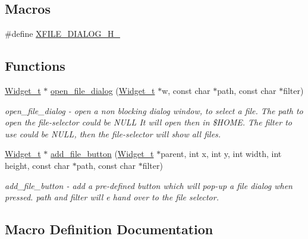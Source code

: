 \subsection*{Macros}
\begin{DoxyCompactItemize}
\item 
\#define \hyperlink{xfile-dialog_8h_a31944331b86f03e65b4333fbab0ccc6f}{X\+F\+I\+L\+E\+\_\+\+D\+I\+A\+L\+O\+G\+\_\+\+H\+\_\+}
\end{DoxyCompactItemize}
\subsection*{Functions}
\begin{DoxyCompactItemize}
\item 
\hyperlink{structWidget__t}{Widget\+\_\+t} $\ast$ \hyperlink{xfile-dialog_8h_a50f41466d35761802fb415011006c6e6}{open\+\_\+file\+\_\+dialog} (\hyperlink{structWidget__t}{Widget\+\_\+t} $\ast$w, const char $\ast$path, const char $\ast$filter)
\begin{DoxyCompactList}\small\item\em open\+\_\+file\+\_\+dialog -\/ open a non blocking dialog window, to select a file. The path to open the file-\/selector could be N\+U\+LL It will open then in \$\+H\+O\+ME. The filter to use could be N\+U\+LL, then the file-\/selector will show all files. \end{DoxyCompactList}\item 
\hyperlink{structWidget__t}{Widget\+\_\+t} $\ast$ \hyperlink{xfile-dialog_8h_aa38720181c2a046546d345b60eb6b7b0}{add\+\_\+file\+\_\+button} (\hyperlink{structWidget__t}{Widget\+\_\+t} $\ast$parent, int x, int y, int width, int height, const char $\ast$path, const char $\ast$filter)
\begin{DoxyCompactList}\small\item\em add\+\_\+file\+\_\+button -\/ add a pre-\/defined button which will pop-\/up a file dialog when pressed. path and filter will e hand over to the file selector. \end{DoxyCompactList}\end{DoxyCompactItemize}


\subsection{Macro Definition Documentation}
\mbox{\label{xfile-dialog_8h_a31944331b86f03e65b4333fbab0ccc6f}} 
